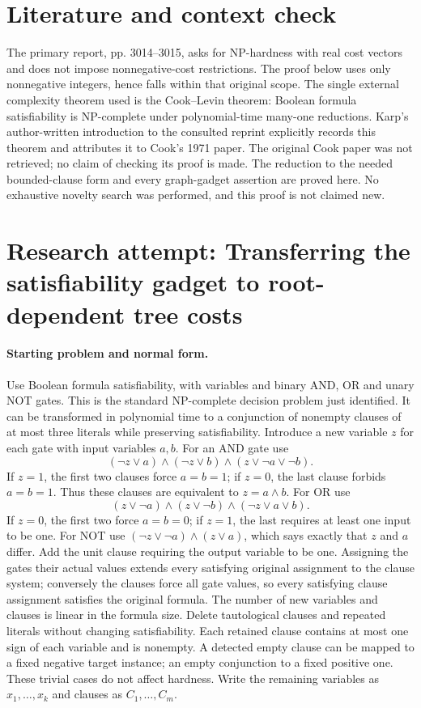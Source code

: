 \documentclass[11pt]{article}
\begin{document}
\section{Literature and context check}
The primary report, pp. 3014--3015, asks for NP-hardness with real cost vectors and does not impose nonnegative-cost restrictions. The proof below uses only nonnegative integers, hence falls within that original scope. The single external complexity theorem used is the Cook--Levin theorem: Boolean formula satisfiability is NP-complete under polynomial-time many-one reductions. Karp's author-written introduction to the consulted reprint explicitly records this theorem and attributes it to Cook's 1971 paper. The original Cook paper was not retrieved; no claim of checking its proof is made. The reduction to the needed bounded-clause form and every graph-gadget assertion are proved here. No exhaustive novelty search was performed, and this proof is not claimed new.
\section{Research attempt: Transferring the satisfiability gadget to root-dependent tree costs}
\paragraph{Starting problem and normal form.}
Use Boolean formula satisfiability, with variables and binary AND, OR and unary NOT gates. This is the standard NP-complete decision problem just identified. It can be transformed in polynomial time to a conjunction of nonempty clauses of at most three literals while preserving satisfiability. Introduce a new variable $z$ for each gate with input variables $a,b$. For an AND gate use
\[
(\neg z\vee a)\wedge(\neg z\vee b)\wedge(z\vee\neg a\vee\neg b).
\]
If $z=1$, the first two clauses force $a=b=1$; if $z=0$, the last clause forbids $a=b=1$. Thus these clauses are equivalent to $z=a\wedge b$. For OR use
\[
(z\vee\neg a)\wedge(z\vee\neg b)\wedge(\neg z\vee a\vee b).
\]
If $z=0$, the first two force $a=b=0$; if $z=1$, the last requires at least one input to be one. For NOT use $(\neg z\vee\neg a)\wedge(z\vee a)$, which says exactly that $z$ and $a$ differ. Add the unit clause requiring the output variable to be one. Assigning the gates their actual values extends every satisfying original assignment to the clause system; conversely the clauses force all gate values, so every satisfying clause assignment satisfies the original formula. The number of new variables and clauses is linear in the formula size.
Delete tautological clauses and repeated literals without changing satisfiability. Each retained clause contains at most one sign of each variable and is nonempty. A detected empty clause can be mapped to a fixed negative target instance; an empty conjunction to a fixed positive one. These trivial cases do not affect hardness. Write the remaining variables as $x_1,\ldots,x_k$ and clauses as $C_1,\ldots,C_m$.
\end{document}
